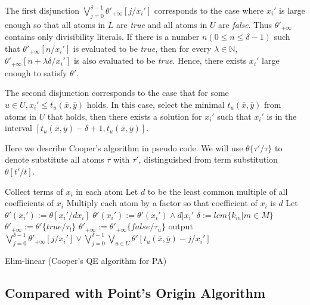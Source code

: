 The first disjunction $\bigvee_{j=0}^{\delta-1} \theta'_{+\infty}[j/x_i']$ corresponds to the case where $x_i'$ is large enough 
so that all atoms in $L$ are \textit{true} and all atoms in  $U$ are \textit{false}. Thus $\theta'_{+\infty}$  contains only divisibility literals.
If there is a number $n (0\le n \le \delta-1)$ such that $ \theta'_{+\infty}[n/x_i']$ is evaluated to be \textit{true},
then for every $\lambda\in \mathbb{N}$,
$\theta'_{+\infty}[n+\lambda\delta/x_i']$ is also evaluated to be \textit{true}.
Hence, there exists $x_i'$ large enough to satisfy $\theta'$.

The second disjunction corresponds to the case that for 
some $u\in U, x_i'\le t_u(\bar{x},\bar{y})$ holds.
In this case, 
select the minimal $t_u(\bar{x},\bar{y})$
from atoms in $U$ that holds,
then there exists a solution for $x_i'$ such that $x_i'$ is in the interval $[t_u(\bar{x},\bar{y})-\delta+1,t_u(\bar{x},\bar{y})]$.

Here we describe Cooper's algorithm in pseudo code.
We will use $\theta\{\tau'/\tau\}$ to denote substitute all atoms $\tau$ with $\tau'$,
distinguished from term substitution $\theta[t'/t]$.

\begin{algorithm}[t]
    \SetAlgoLined
    
    Collect terms of $x_i$ in each atom\;
    Let $d$ to be the least common multiple of all coefficients of $x_i$\;
    Multiply each atom by a factor so that coefficient of $x_i $ is $d$\;
    Let $\theta'(x_i'):= \theta[x_i'/dx_i]$\;
    $\theta'(x_i') := \theta'(x_i') \wedge d| x_i'$\;
    $\delta :=  lcm\{k_m|m\in M\}$\;
    {
        $\theta'_{+\infty}:=  \theta'\{\textit{true}/\tau_l\}$
    }
    {
        $\theta'_{+\infty}:=  \theta'_{+\infty}\{\textit{false}/\tau_u\}$
    }
    output $\bigvee_{j=0}^{\delta-1} \theta'_{+\infty}[j/x_i'] \vee \bigvee_{j=0}^{\delta-1} \bigvee_{u\in U}\theta'[t_u(\bar{x},\bar{y})-j/x_i']$
    \caption{Elim-linear (Cooper's QE algorithm for PA)}
\end{algorithm}


\subsection{Compared with Point's Origin Algorithm}

